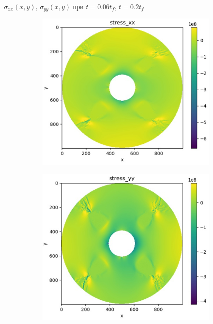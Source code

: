 \documentclass{beamer}
\begin{document}
\begin{frame}{$\sigma_{xx}(x,y),\,\sigma_{yy}(x,y)$ при $t = 0.06t_f,\,t=0.2t_f$}
\begin{figure}[H]
\begin{subfigure}[H]{0.4\textwidth}
\end{subfigure}	
\begin{subfigure}[H]{0.4\textwidth}
	\includegraphics[width=\textwidth]{stressx_002}
\end{subfigure}
\qquad\qquad
\begin{subfigure}[H]{0.4\textwidth}
	\includegraphics[width=\textwidth]{stressy_002}
\end{subfigure}	
\end{figure}	
	\end{frame}
\end{document}
